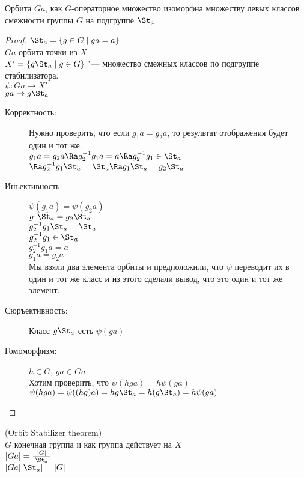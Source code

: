 \begin{theorem}
Орбита $Ga$, как $G$-операторное множество изоморфна
множеству левых классов смежности группы $G$ на подгруппе $\St_a$
\end{theorem}
\begin{proof}
$\St_a = \{g \in G \mid ga = a\}$\\
$Ga$ орбита точки из $X$\\
$X' = \{g\St_a \mid g \in G\}$ "--- множество смежных классов по подгруппе стабилизатора.\\
$\psi \colon Ga \to X'$\\
$ga \to g \St_a$\\
\begin{description}
\item[Корректность:]
Нужно проверить, что если $g_1a = g_2a$, то результат отображения будет один и тот же.\\
$g_1a  = g_2 a \Ra g_2^{-1}g_1a = a \Ra g_2^{-1}g_1 \in \St_a$\\
$\Ra g_2^{-1}g_1 \St_a = \St_a \Ra g_1 \St_a = g_2 \St_a$\\

\item[Инъективность:]
$\psi (g_1 a) = \psi (g_2a)$\\
$g_1\St_a = g_2\St_a$\\
$g_2^{-1}g_1\St_a = \St_a$\\
$g_2^{-1}g_1 \in \St_a$\\
$g_2^{-1}g_1a = a$\\
$g_1a = g_2a$\\
Мы взяли два элемента орбиты и предположили, что $\psi$ переводит их
в один и тот же класс и из этого сделали вывод, что это один и тот же элемент. 
\\
\item[Сюръективность:]
Класс $g\St_a$ есть $\psi(ga)$\\

\item[Гомоморфизм:] 
$h \in G$, $ga \in Ga$\\
Хотим проверить, что $\psi(hga) = h \psi(ga)$\\
$\psi(hga) = \psi((hg)a) = hg\St_a = h(g\St_a) = h \psi(ga)$\\
\end{description}
\end{proof}
\begin{conseq}\hfill
(Orbit Stabilizer theorem)\\
$G$ конечная группа и как группа действует на $X$\\
$|Ga| = \frac{|G|}{|\St_a|}$\\
$|Ga||\St_a| = |G|$\\
\end{conseq}
